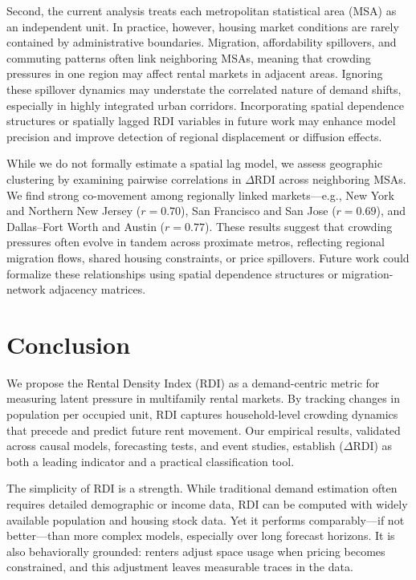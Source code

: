 \documentclass[APA,Times1COL]{WileyNJDv5} %
\begin{document}
Second, the current analysis treats each metropolitan statistical area (MSA) as an independent unit. In practice, however, housing market conditions are rarely contained by administrative boundaries. Migration, affordability spillovers, and commuting patterns often link neighboring MSAs, meaning that crowding pressures in one region may affect rental markets in adjacent areas. Ignoring these spillover dynamics may understate the correlated nature of demand shifts, especially in highly integrated urban corridors. Incorporating spatial dependence structures or spatially lagged RDI variables in future work may enhance model precision and improve detection of regional displacement or diffusion effects.

While we do not formally estimate a spatial lag model, we assess geographic clustering by examining pairwise correlations in $\Delta \text{RDI}$ across neighboring MSAs. We find strong co-movement among regionally linked markets—e.g., New York and Northern New Jersey ($r = 0.70$), San Francisco and San Jose ($r = 0.69$), and Dallas–Fort Worth and Austin ($r = 0.77$). These results suggest that crowding pressures often evolve in tandem across proximate metros, reflecting regional migration flows, shared housing constraints, or price spillovers. Future work could formalize these relationships using spatial dependence structures or migration-network adjacency matrices.




\section{Conclusion}

We propose the Rental Density Index (RDI) as a demand-centric metric for measuring latent pressure in multifamily rental markets. By tracking changes in population per occupied unit, RDI captures household-level crowding dynamics that precede and predict future rent movement. Our empirical results, validated across causal models, forecasting tests, and event studies, establish (\(\Delta\text{RDI}\)) as both a leading indicator and a practical classification tool.

The simplicity of RDI is a strength. While traditional demand estimation often requires detailed demographic or income data, RDI can be computed with widely available population and housing stock data. Yet it performs comparably—if not better—than more complex models, especially over long forecast horizons. It is also behaviorally grounded: renters adjust space usage when pricing becomes constrained, and this adjustment leaves measurable traces in the data.
\end{document}
